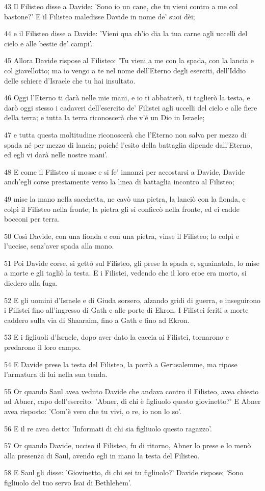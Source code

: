 \par 43 Il Filisteo disse a Davide: 'Sono io un cane, che tu vieni contro a me col bastone?' E il Filisteo maledisse Davide in nome de' suoi dèi;
\par 44 e il Filisteo disse a Davide: 'Vieni qua ch'io dia la tua carne agli uccelli del cielo e alle bestie de' campi'.
\par 45 Allora Davide rispose al Filisteo: 'Tu vieni a me con la spada, con la lancia e col giavellotto; ma io vengo a te nel nome dell'Eterno degli eserciti, dell'Iddio delle schiere d'Israele che tu hai insultato.
\par 46 Oggi l'Eterno ti darà nelle mie mani, e io ti abbatterò, ti taglierò la testa, e darò oggi stesso i cadaveri dell'esercito de' Filistei agli uccelli del cielo e alle fiere della terra; e tutta la terra riconoscerà che v'è un Dio in Israele;
\par 47 e tutta questa moltitudine riconoscerà che l'Eterno non salva per mezzo di spada né per mezzo di lancia; poiché l'esito della battaglia dipende dall'Eterno, ed egli vi darà nelle nostre mani'.
\par 48 E come il Filisteo si mosse e si fe' innanzi per accostarsi a Davide, Davide anch'egli corse prestamente verso la linea di battaglia incontro al Filisteo;
\par 49 mise la mano nella sacchetta, ne cavò una pietra, la lanciò con la fionda, e colpì il Filisteo nella fronte; la pietra gli si conficcò nella fronte, ed ei cadde bocconi per terra.
\par 50 Così Davide, con una fionda e con una pietra, vinse il Filisteo; lo colpì e l'uccise, senz'aver spada alla mano.
\par 51 Poi Davide corse, si gettò sul Filisteo, gli prese la spada e, sguainatala, lo mise a morte e gli tagliò la testa. E i Filistei, vedendo che il loro eroe era morto, si diedero alla fuga.
\par 52 E gli uomini d'Israele e di Giuda sorsero, alzando gridi di guerra, e inseguirono i Filistei fino all'ingresso di Gath e alle porte di Ekron. I Filistei feriti a morte caddero sulla via di Shaaraim, fino a Gath e fino ad Ekron.
\par 53 E i figliuoli d'Israele, dopo aver dato la caccia ai Filistei, tornarono e predarono il loro campo.
\par 54 E Davide prese la testa del Filisteo, la portò a Gerusalemme, ma ripose l'armatura di lui nella sua tenda.
\par 55 Or quando Saul avea veduto Davide che andava contro il Filisteo, avea chiesto ad Abner, capo dell'esercito: 'Abner, di chi è figliuolo questo giovinetto?' E Abner avea risposto: 'Com'è vero che tu vivi, o re, io non lo so'.
\par 56 E il re avea detto: 'Informati di chi sia figliuolo questo ragazzo'.
\par 57 Or quando Davide, ucciso il Filisteo, fu di ritorno, Abner lo prese e lo menò alla presenza di Saul, avendo egli in mano la testa del Filisteo.
\par 58 E Saul gli disse: 'Giovinetto, di chi sei tu figliuolo?' Davide rispose: 'Sono figliuolo del tuo servo Isai di Bethlehem'.


